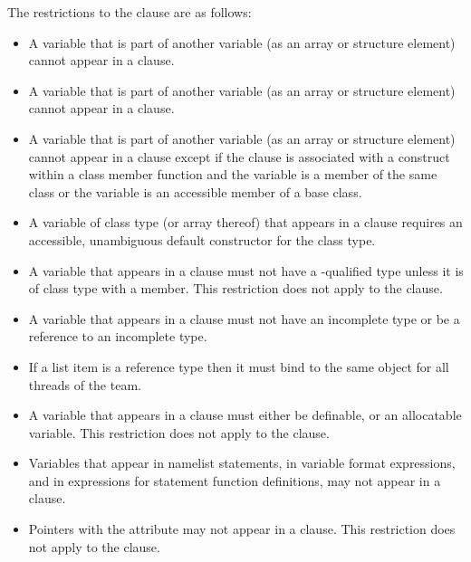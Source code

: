 \restrictions
The restrictions to the  clause are as follows:

\begin{itemize}
\cspecificstart
\item A variable that is part of another variable (as an array or structure element) cannot 
appear in a  clause.
\cspecificend

\fortranspecificstart
\item A variable that is part of another variable (as an array or structure element) cannot 
appear in a  clause.
\fortranspecificend

\cppspecificstart
\item A variable that is part of another variable (as an array or structure element) cannot 
appear in a  clause except if the  clause is associated with a construct within a class member function and the variable is a member of the same class or the variable is an accessible member of a base class.

\item A variable of class type (or array thereof) that appears in a  clause requires 
an accessible, unambiguous default constructor for the class type. 
\cppspecificend

\ccppspecificstart
\item A variable that appears in a  clause must not have a -qualified type 
unless it is of class type with a  member. This restriction does not apply to 
the  clause.

\item A variable that appears in a  clause must not have an incomplete type or be a reference to an incomplete type.
\item If a list item is a reference type then it must bind to the same object for all threads of the team. 
\ccppspecificend

\fortranspecificstart
\item A variable that appears in a  clause must either be definable, or an 
allocatable variable. This restriction does not apply to the  clause.

\item Variables that appear in namelist statements, in variable format expressions, and in 
expressions for statement function definitions, may not appear in a  clause.

\item Pointers with the  attribute may not appear in a  clause. This 
restriction does not apply to the  clause. 
\fortranspecificend
\end{itemize}










